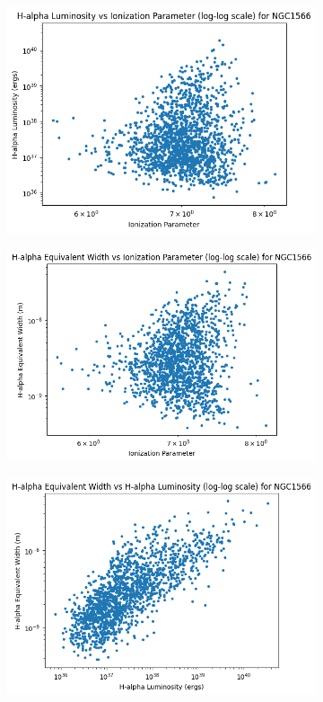 \documentclass[12pt]{report}
\begin{document}
\begin{figure}[htbp]
    \begin{subfigure}{0.3\textwidth}
        \centering
        \includegraphics[width=\linewidth]{image7.png}
        \label{fig:image7}
    \end{subfigure}
    \hfill
    \begin{subfigure}{0.3\textwidth}
        \centering
        \includegraphics[width=\linewidth]{image8.png}
        \label{fig:image8}
    \end{subfigure}
    \hfill
    \begin{subfigure}{0.3\textwidth}
        \centering
        \includegraphics[width=\linewidth]{image9.png}

\end{subfigure}
\end{figure}
\end{document}
